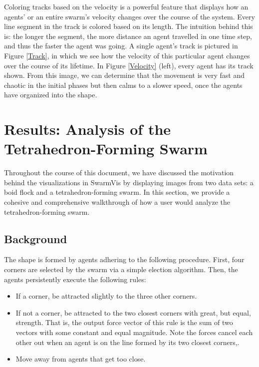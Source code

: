 \documentclass[conference]{IEEEtran}
\begin{document}
Coloring tracks based on the velocity is a powerful feature that displays how an agents' or an entire swarm's
velocity changes over the course of the system.
Every line segment in the track is colored based on its length.
The intuition behind this is: the longer the segment, the more distance an agent travelled in one time step,
and thus the faster the agent was going.
A single agent's track is pictured in Figure \ref{Track}, in which we see how the velocity of this particular agent changes
over the course of its lifetime.
In Figure \ref{Velocity} (left), every agent has its track shown.
From this image, we can determine that the movement is very fast and chaotic in the initial phases but then calms to a slower
speed, once the agents have organized into the shape.

\section{Results: Analysis of the Tetrahedron-Forming Swarm}

Throughout the course of this document, we have discussed the motivation behind the visualizations in SwarmVis by
displaying images from two data sets: a boid flock and a tetrahedron-forming swarm.
In this section, we provide a cohesive and comprehensive walkthrough of how a user would
analyze the tetrahedron-forming swarm.

\subsection{Background}

The shape is formed by agents adhering to the following procedure.
First, four corners are selected by the swarm via a simple election algorithm.
Then, the agents persistently execute the following rules:
\begin{itemize}
	\item If a corner, be attracted slightly to the three other corners.
	\item If not a corner, be attracted to the two closest corners with great, but equal, strength.
	That is, the output force vector of this rule is the sum of two vectors with some constant and equal magnitude.
	Note the forces cancel each other out when an agent is on the line formed by its two closest corners,.
	\item Move away from agents that get too close.
\end{itemize}
\end{document}
